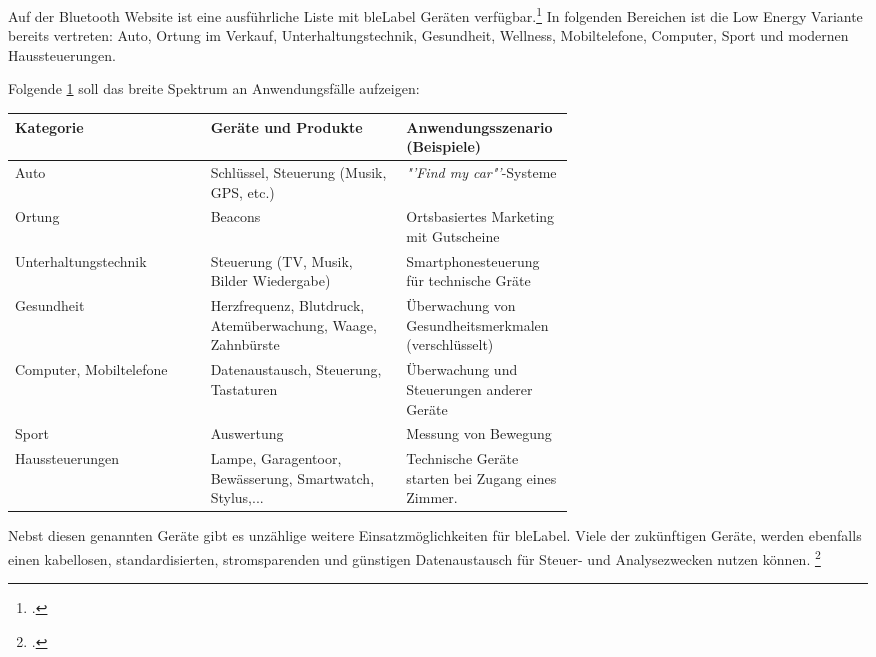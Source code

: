 Auf der Bluetooth Website ist eine ausführliche Liste mit \gls{bleLabel} Geräten verfügbar.\footcite{Bluetooth_Smart_Devices_List_Bluetooth_Technology_Website_2015-05-14}
In folgenden Bereichen ist die Low Energy Variante bereits vertreten: Auto, Ortung im Verkauf, Unterhaltungstechnik, Gesundheit, Wellness, Mobiltelefone, Computer, Sport und modernen Haussteuerungen.

Folgende \cref{tab:usecases} soll das breite Spektrum an Anwendungsfälle aufzeigen:
\begin{table}[H]
	\small\sffamily\renewcommand{\arraystretch}{1.4}
	\label{tab:usecases}
	\begin{tabular}{lp{0.35\linewidth}p{0.30\linewidth}}
		\toprule
		Kategorie & Geräte und Produkte & Anwendungsszenario (Beispiele)\\
		\midrule
		Auto & Schlüssel, Steuerung (Musik, GPS, etc.) & \textit{"'Find my car"'}-Systeme\\
		Ortung & Beacons & Ortsbasiertes Marketing mit Gutscheine\\
		Unterhaltungstechnik & Steuerung (TV, Musik, Bilder Wiedergabe) & Smartphonesteuerung für technische Gräte\\
		Gesundheit & Herzfrequenz, Blutdruck, Atemüberwachung, Waage, Zahnbürste & Überwachung von Gesundheitsmerkmalen (verschlüsselt)\\
		Computer, Mobiltelefone & Datenaustausch, Steuerung, Tastaturen & Überwachung und Steuerungen anderer Geräte\\
		Sport & Auswertung & Messung von Bewegung\\
		Haussteuerungen & Lampe, Garagentoor, Bewässerung, Smartwatch, Stylus,... & Technische Geräte starten bei Zugang eines Zimmer.\\
		\bottomrule
	\end{tabular}
\end{table}

Nebst diesen genannten Geräte gibt es unzählige weitere Einsatzmöglichkeiten für \gls{bleLabel}.
Viele der zukünftigen Geräte, werden ebenfalls einen kabellosen, standardisierten, stromsparenden und günstigen Datenaustausch für Steuer- und Analysezwecken nutzen können.
\footcite[][3,5]{ti_whitepaper_2015-05-08}





